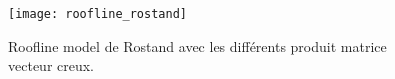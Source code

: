 \begin{figure}
  \centering
  \texttt{[image: roofline\_rostand]}
  \caption{Roofline model de Rostand avec les différents produit matrice vecteur creux.}
  \label{fig:roofline_rostand}
\end{figure}







